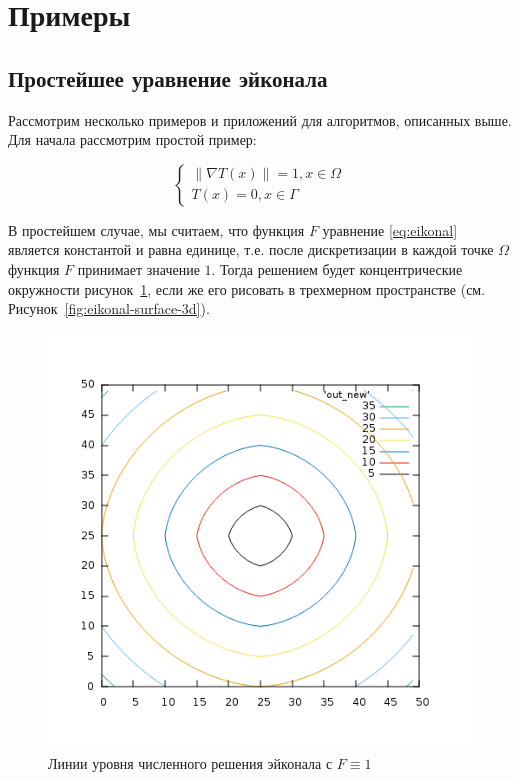 \section{Примеры}
\label{sec:samples}

\subsection{Простейшее уравнение эйконала}
\label{sec:simple-eikonal}

Рассмотрим несколько примеров и приложений для алгоритмов, описанных
выше. Для начала рассмотрим простой пример:


\begin{equation}
  \label{eq:eik-sur}
  \left\{ \begin{matrix}
      \| \nabla T(x) \| = 1, x \in \Omega \\
      T(x) = 0, x \in \Gamma
    \end{matrix}\right.
\end{equation}

В простейшем случае, мы считаем, что функция $F$ уравнение
\eqref{eq:eikonal} является константой и равна единице, т.е. после
дискретизации в каждой точке $\Omega$ функция $F$ принимает значение
$1$. Тогда решением будет концентрические окружности
рисунок~\ref{fig:eikonal-surface}, если же его рисовать в трехмерном
пространстве (см. Рисунок~\ref{fig:eikonal-surface-3d}).

\begin{figure}[H]
  \centering
  \includegraphics[width=\linewidth]{img/eikonal_simple_surface.png}
  \hfil \caption{Линии уровня численного решения эйконала с $F\equiv 1$ }
  \label{fig:eikonal-surface}
\end{figure}

